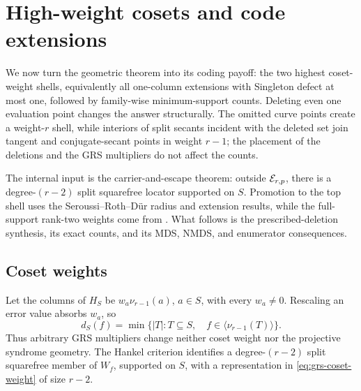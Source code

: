 \section{High-weight cosets and code extensions}
\label{sec:high-weight-cosets}

We now turn the geometric theorem into its coding payoff: the two highest
coset-weight shells, equivalently all one-column extensions with Singleton
defect at most one, followed by family-wise minimum-support counts.  Deleting
even one evaluation point changes the answer structurally.  The omitted curve
points create a weight-\(r\) shell, while interiors of split secants incident
with the deleted set join tangent and conjugate-secant points in weight
\(r-1\); the placement of the deletions and the GRS multipliers do not affect
the counts.

The internal input is the carrier-and-escape theorem: outside
\(\mathcal E_{r,p}\), there is a degree-\((r-2)\) split squarefree
locator supported on \(S\).  Promotion to the top shell uses the
Seroussi--Roth--D\"ur radius and extension results, while the full-support
rank-two weights come from \cite{ZWK2020}.  What follows is the
prescribed-deletion synthesis, its exact counts, and its MDS, NMDS, and
enumerator consequences.

\subsection{Coset weights}

Let the columns of \(H_S\) be \(w_a\nu_{r-1}(a)\), \(a\in S\), with every
\(w_a\ne0\).  Rescaling an error value absorbs \(w_a\), so
\begin{equation}\label{eq:grs-coset-weight}
 d_S(f)=\min\bigl\{|T|:T\subseteq S,\quad
 f\in\langle\nu_{r-1}(T)\rangle\bigr\}.
\end{equation}
Thus arbitrary GRS multipliers change neither coset weight nor the projective
syndrome geometry.  The Hankel criterion identifies a degree-\((r-2)\) split
squarefree member of \(W_f\), supported on \(S\), with a representation in
\eqref{eq:grs-coset-weight} of size \(r-2\).

